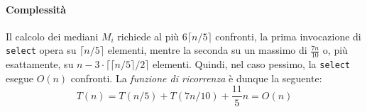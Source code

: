 \paragraph{Complessità}
Il calcolo dei mediani $M_i$ richiede al più $6\lceil n/5\rceil$ confronti, la
prima invocazione di \texttt{select} opera su $\lceil n/5\rceil$ elementi, mentre
la seconda su un massimo di $\frac{7n}{10}$ o, più esattamente, su $n-3\cdot\lceil
\lceil n/5\rceil/2\rceil$ elementi. Quindi, nel caso pessimo, la \texttt{select}
esegue $O(n)$ confronti. La \emph{funzione di ricorrenza} è dunque la seguente:
\[T(n)=T(n/5)+T(7n/10)+\frac{11}{5}n=O(n)\]